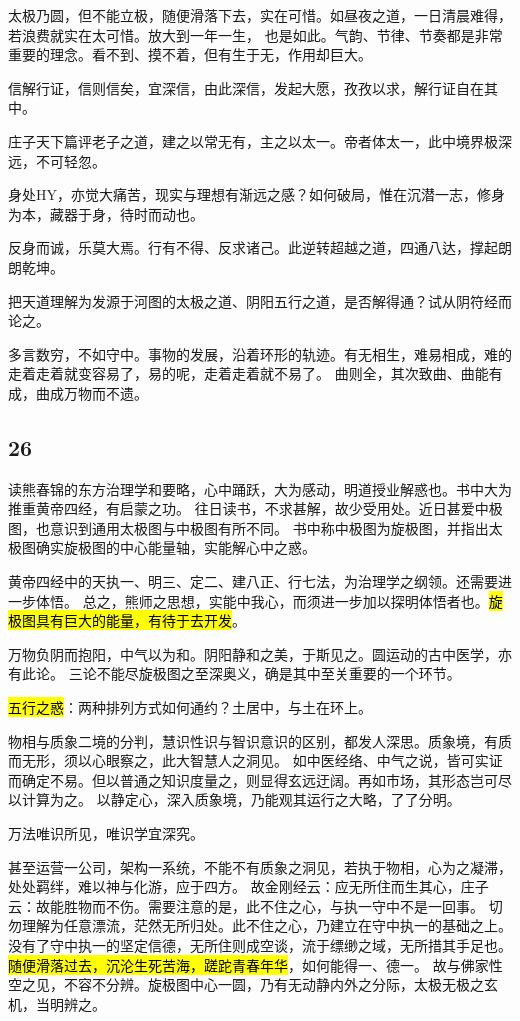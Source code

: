 太极乃圆，但不能立极，随便滑落下去，实在可惜。如昼夜之道，一日清晨难得，若浪费就实在太可惜。放大到一年一生，
也是如此。气韵、节律、节奏都是非常重要的理念。看不到、摸不着，但有生于无，作用却巨大。

信解行证，信则信矣，宜深信，由此深信，发起大愿，孜孜以求，解行证自在其中。

庄子天下篇评老子之道，建之以常无有，主之以太一。帝者体太一，此中境界极深远，不可轻忽。

身处HY，亦觉大痛苦，现实与理想有渐远之感？如何破局，惟在沉潜一志，修身为本，藏器于身，待时而动也。

反身而诚，乐莫大焉。行有不得、反求诸己。此逆转超越之道，四通八达，撑起朗朗乾坤。

把天道理解为发源于河图的太极之道、阴阳五行之道，是否解得通？试从阴符经而论之。

多言数穷，不如守中。事物的发展，沿着环形的轨迹。有无相生，难易相成，难的走着走着就变容易了，易的呢，走着走着就不易了。
曲则全，其次致曲、曲能有成，曲成万物而不遗。

\subsection{26}

读熊春锦的东方治理学和要略，心中踊跃，大为感动，明道授业解惑也。书中大为推重黄帝四经，有启蒙之功。
往日读书，不求甚解，故少受用处。近日甚爱中极图，也意识到通用太极图与中极图有所不同。
书中称中极图为旋极图，并指出太极图确实旋极图的中心能量轴，实能解心中之惑。

黄帝四经中的天执一、明三、定二、建八正、行七法，为治理学之纲领。还需要进一步体悟。
总之，熊师之思想，实能中我心，而须进一步加以探明体悟者也。\hl{旋极图具有巨大的能量，有待于去开发}。

万物负阴而抱阳，中气以为和。阴阳静和之美，于斯见之。圆运动的古中医学，亦有此论。
三论不能尽旋极图之至深奥义，确是其中至关重要的一个环节。

\hl{五行之惑}：两种排列方式如何通约？土居中，与土在环上。

物相与质象二境的分判，慧识性识与智识意识的区别，都发人深思。质象境，有质而无形，须以心眼察之，此大智慧人之洞见。
如中医经络、中气之说，皆可实证而确定不易。但以普通之知识度量之，则显得玄远迂阔。再如市场，其形态岂可尽以计算为之。
以静定心，深入质象境，乃能观其运行之大略，了了分明。

万法唯识所见，唯识学宜深究。

甚至运营一公司，架构一系统，不能不有质象之洞见，若执于物相，心为之凝滞，处处羁绊，难以神与化游，应于四方。
故金刚经云：应无所住而生其心，庄子云：故能胜物而不伤。需要注意的是，此不住之心，与执一守中不是一回事。
切勿理解为任意漂流，茫然无所归处。此不住之心，乃建立在守中执一的基础之上。
没有了守中执一的坚定信德，无所住则成空谈，流于缥缈之域，无所措其手足也。
\hl{随便滑落过去，沉沦生死苦海，蹉跎青春年华}，如何能得一、德一。
故与佛家性空之见，不容不分辨。旋极图中心一圆，乃有无动静内外之分际，太极无极之玄机，当明辨之。

